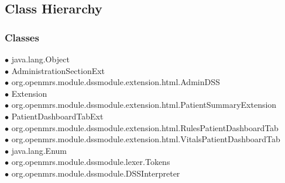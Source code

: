 \sloppy
\subsection{Class Hierarchy}{
\thispagestyle{empty}

\subsubsection*{Classes}
{\raggedright
\hspace{0.0cm} $\bullet$ java.lang.Object {\tiny {}} \\
\hspace{1.0cm} $\bullet$ AdministrationSectionExt {\tiny } \\
\hspace{2.0cm} $\bullet$ org.openmrs.module.dssmodule.extension.html.AdminDSS {\tiny {}} \\
\hspace{1.0cm} $\bullet$ Extension {\tiny } \\
\hspace{2.0cm} $\bullet$ org.openmrs.module.dssmodule.extension.html.PatientSummaryExtension {\tiny {}} \\
\hspace{1.0cm} $\bullet$ PatientDashboardTabExt {\tiny } \\
\hspace{2.0cm} $\bullet$ org.openmrs.module.dssmodule.extension.html.RulesPatientDashboardTab {\tiny {}} \\
\hspace{2.0cm} $\bullet$ org.openmrs.module.dssmodule.extension.html.VitalsPatientDashboardTab {\tiny {}} \\
\hspace{1.0cm} $\bullet$ java.lang.Enum {\tiny {}} \\
\hspace{2.0cm} $\bullet$ org.openmrs.module.dssmodule.lexer.Tokens {\tiny {}} \\
\hspace{1.0cm} $\bullet$ org.openmrs.module.dssmodule.DSSInterpreter {\tiny {}} \\
}}
